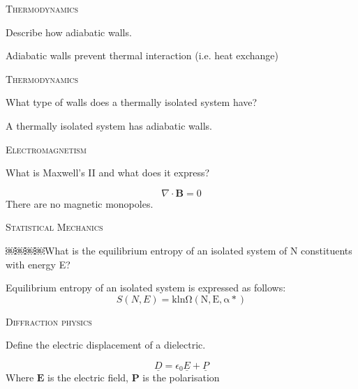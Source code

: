 \documentclass{article}
\newenvironment{flashcard}[2][]
  {\noindent\textsc{\Large#1}\par\vfill
   {\centering\Large#2\par}
   \vfill
   \newpage\Large\centering
  }
  {\newpage}
\begin{document}

\begin{flashcard}[Thermodynamics]{Describe how adiabatic walls.}

Adiabatic walls prevent thermal interaction (i.e. heat exchange) 
\end{flashcard}


\begin{flashcard}[Thermodynamics]{What type of walls does a thermally isolated system have?}
A thermally isolated system has adiabatic walls.
\end{flashcard}


\begin{flashcard}[Electromagnetism]{What is Maxwell's II  and what does it express?}
$$\nabla \cdot \mathbf{B} = 0$$
There are no magnetic monopoles.
\end{flashcard}


\begin{flashcard}[Statistical Mechanics]{￼￼￼￼What is the equilibrium entropy of an isolated system of N constituents with energy E?}
Equilibrium entropy of an isolated system is expressed as follows:
$$S(N, E) = \mathrm{k ln \Omega(N, E, {\alpha*})}$$

\end{flashcard}


\begin{flashcard}[Diffraction physics]{Define the electric displacement of a dielectric.}
$$\underline{D}=\epsilon_0 \underline{E}+\underline{P}$$
Where $ \mathbf{E}$ is the electric field, $\mathbf{P}$ is the polarisation

\end{flashcard}
\end{document}
